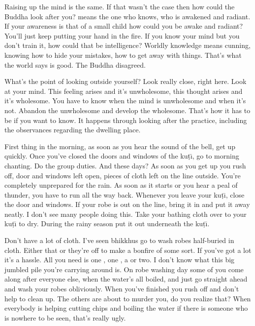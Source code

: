 Raising up the mind is the same. If that wasn't the case then how could the Buddha look after you?  means the one who knows, who is awakened and radiant. If your awareness is that of a small child how could you be awake and radiant? You'll just keep putting your hand in the fire. If you know your mind but you don't train it, how could that be intelligence? Worldly knowledge means cunning, knowing how to hide your mistakes, how to get away with things. That's what the world says is good. The Buddha disagreed.

What's the point of looking outside yourself? Look really close, right here. Look at your mind. This feeling arises and it's unwholesome, this thought arises and it's wholesome. You have to know when the mind is unwholesome and when it's not. Abandon the unwholesome and develop the wholesome. That's how it has to be if you want to know. It happens through looking after the practice, including the observances regarding the dwelling place.

First thing in the morning, as soon as you hear the sound of the bell, get up quickly. Once you've closed the doors and windows of the ku\d{t}\={\i}, go to morning chanting. Do the group duties. And these days? As soon as you get up you rush off, door and windows left open, pieces of cloth left on the line outside. You're completely unprepared for the rain. As soon as it starts or you hear a peal of thunder, you have to run all the way back. Whenever you leave your ku\d{t}\={\i}, close the door and windows. If your robe is out on the line, bring it in and put it away neatly. I don't see many people doing this. Take your bathing cloth over to your ku\d{t}\={\i} to dry. During the rainy season put it out underneath the ku\d{t}\={\i}.

Don't have a lot of cloth. I've seen bhikkhus go to wash robes half-buried in cloth. Either that or they're off to make a bonfire of some sort. If you've got a lot it's a hassle. All you need is one , one , a  or two. I don't know what this big jumbled pile you're carrying around is. On robe washing day some of you come along after everyone else, when the water's all boiled, and just go straight ahead and wash your robes obliviously. When you've finished you rush off and don't help to clean up. The others are about to murder you, do you realize that? When everybody is helping cutting chips and boiling the water if there is someone who is nowhere to be seen, that's really ugly.

